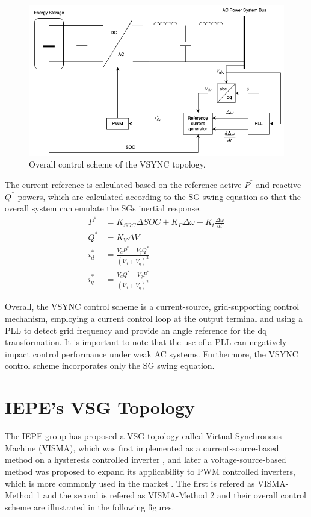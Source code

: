 \begin{figure}
    \centering
    \includegraphics[width=12cm]{images/VSYNC.png}
    \caption{Overall control scheme of the VSYNC topology.}
    \label{fig:VSYNC}
\end{figure}

The current reference is calculated based on the reference active $P^*$ and
reactive $Q^*$ powers, which are calculated according to the SG swing equation
so that the overall system can emulate the SGs inertial response.
\begin{equation*}
    \begin{aligned}
        P^* &= K_{SOC}\Delta SOC + K_P \Delta\omega + K_t \frac{\Delta \omega}{dt}\\
        Q^* &= K_V \Delta V\\
        i_{d}^* &= \frac{V_d P^* - V_q Q^*}{(V_d + V_q)^2}\\
        i_{q}^* &= \frac{V_d Q^* - V_q P^*}{(V_d + V_q)^2}
    \end{aligned}
\end{equation*}

Overall, the VSYNC control scheme is a current-source, grid-supporting control
mechanism, employing a current control loop at the output terminal and using a
PLL to detect grid frequency and provide an angle reference for the dq
transformation. It is important to note that the use of a PLL can negatively
impact control performance under weak AC systems. Furthermore, the VSYNC control
scheme incorporates only the SG swing equation.

\section{IEPE's VSG Topology}

The IEPE group has proposed a VSG topology called Virtual Synchronous Machine
(VISMA), which was first implemented as a current-source-based method on a
hysteresis controlled inverter \cite{beck2007vsm,chen2011improving}, and later a
voltage-source-based method was proposed to expand its applicability to PWM
controlled inverters, which is more commonly used in the market
\cite{chen2012comparison}. The first is refered as VISMA-Method 1 and the second
is refered as VISMA-Method 2 and their overall control scheme are illustrated in
the following figures.

